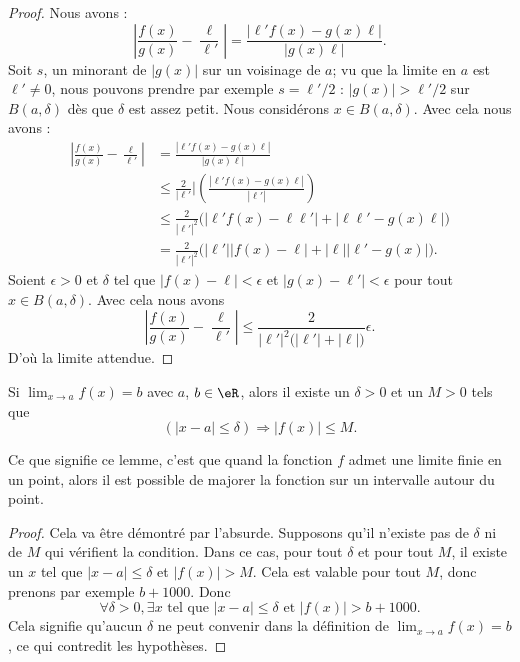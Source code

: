 \begin{proof}
    Nous avons :
    \begin{equation}
        \left| \frac{ f(x) }{ g(x) }-\frac{ \ell }{ \ell' } \right| =\frac{ | \ell'f(x)-g(x)\ell | }{ |g(x)\ell| }.
    \end{equation}
    Soit \( s\), un minorant de \( | g(x) |\) sur un voisinage de \( a\); vu que la limite en \( a\) est \( \ell'\neq 0\), nous pouvons prendre par exemple \( s=\ell'/2\) : \( | g(x) |>\ell'/2\) sur \( B(a,\delta)\) dès que \( \delta\) est assez petit. Nous considérons \( x\in B(a,\delta)\). Avec cela nous avons :
    \begin{subequations}
        \begin{align}
            \left| \frac{ f(x) }{ g(x) }-\frac{ \ell }{ \ell' } \right| &=\frac{ | \ell'f(x)-g(x)\ell | }{ |g(x)\ell| }\\
            &\leq \frac{ 2 }{ | \ell'} |\left( \frac{ | \ell'f(x)-g(x)\ell | }{ | \ell' | } \right) \\
            &\leq \frac{ 2 }{ | \ell' |^2 }\big( | \ell'f(x)-\ell\ell' |+| \ell\ell'-g(x)\ell | \big)\\
            &=\frac{ 2 }{ | \ell' |^2 }\big( | \ell' | |f(x)-\ell |+| \ell | |\ell'-g(x) | \big).
        \end{align}
    \end{subequations}
    Soient \( \epsilon>0\) et \( \delta\) tel que \( | f(x)-\ell |<\epsilon\) et \( | g(x)-\ell' |<\epsilon\) pour tout \( x\in B(a,\delta)\). Avec cela nous avons
    \begin{equation}
        \left| \frac{ f(x) }{ g(x) }-\frac{ \ell }{ \ell' } \right| \leq\frac{ 2 }{ | \ell' |^2\big( | \ell' |+| \ell | \big) }\epsilon.
    \end{equation}
    D'où la limite attendue.
\end{proof}

\begin{lemma}       \label{LemLimMajorableVois}
    Si $\lim_{x\to a}f(x)=b$ avec $a$, $b\in\eR$, alors il existe un $\delta>0$ et un $M>0$ tels que
    \[
        (| x-a |\leq\delta)\Rightarrow | f(x) |\leq M.
    \]
\end{lemma}

Ce que signifie ce lemme, c'est que quand la fonction $f$ admet une limite finie en un point, alors il est possible de majorer la fonction sur un intervalle autour du point.

\begin{proof}
    Cela va être démontré par l'absurde. Supposons qu'il n'existe pas de $\delta$ ni de $M$ qui vérifient la condition. Dans ce cas, pour tout $\delta$ et pour tout $M$, il existe un $x$ tel que $| x-a |\leq\delta$ et $| f(x) |> M$. Cela est valable pour tout $M$, donc prenons par exemple $b+1000$. Donc
    \begin{equation}
    \forall\delta>0,\exists x\text{ tel que } | x-a |\leq\delta\text{ et }| f(x) |>b+1000.
    \end{equation}
    Cela signifie qu'aucun $\delta$ ne peut convenir dans la définition de $\lim_{x\to a}f(x)=b$, ce qui contredit les hypothèses.
\end{proof}

